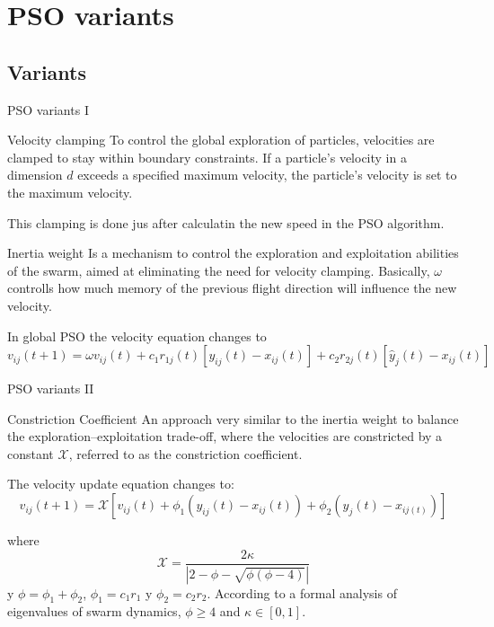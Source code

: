 \documentclass[aspectratio=169,compress,10pt]{beamer}
\begin{document}
\section{PSO variants}
\subsection{Variants}

\begin{frame}{PSO variants I}
\begin{block}{Velocity clamping}
To control the global exploration of particles, velocities
are clamped to stay within boundary constraints.
If a particle’s velocity in a dimension $d$ exceeds
a specified maximum velocity, the particle’s velocity is set to the maximum velocity.

This clamping is done jus after calculatin the new speed in the PSO algorithm.
\end{block}
    
\begin{block}{Inertia weight}
Is a mechanism to
control the exploration and exploitation abilities of the swarm, aimed at eliminating the need for velocity clamping.
Basically, $\omega$ controlls how much memory of
the previous flight direction will influence the new velocity.

In global PSO the velocity equation changes to
\begin{equation}
	v_{ij}(t+1) = \omega v_{ij}(t) + c_1r_{1j}(t)[y_{ij}(t) - x_{ij}(t)] + c_2 r_{2j}(t)[\hat{y}_j(t) - x_{ij}(t)]
	\label{eq:velocidad-peso-inercia}
\end{equation}
\end{block}

\end{frame}


\begin{frame}{PSO variants II}
\begin{block}{Constriction Coefficient}
An approach very similar to the inertia weight to balance the
exploration–exploitation trade-off, where the velocities are constricted by a constant $\mathcal{X}$, referred to as the constriction coefficient.

The velocity update equation changes to:
\begin{equation}
	v_{ij}(t+1) = \mathcal{X} [ v_{ij}(t) + \phi_1 (y_{ij}(t) - x_{ij}(t)) + \phi_2(\hat{y}_j(t) - x_{ij(t)})   ]
\end{equation}

where
$$
\mathcal{X} = \frac{2 \kappa}{| 2 - \phi - \sqrt{\phi ( \phi - 4)}  |}
$$
y $\phi = \phi_1 + \phi_2$, $\phi_1 = c_1 r_1$ y $\phi_2 = c_2 r_2$.
According to a formal analysis of eigenvalues of swarm dynamics,  $\phi \geq 4$ and $\kappa \in [0,1]$.
\end{block}
\end{frame}
\end{document}
